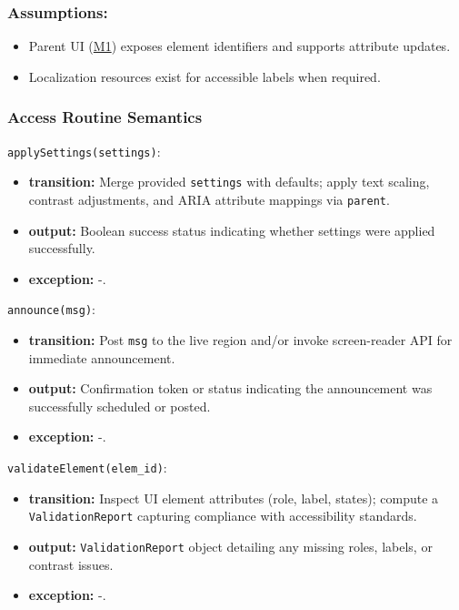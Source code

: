 \documentclass[12pt, titlepage]{article}
\begin{document}
\subsubsection{Assumptions:}
\begin{itemize}
  \item Parent UI (\hyperref[M1]{M1}) exposes element identifiers and supports attribute updates.
  \item Localization resources exist for accessible labels when required.
\end{itemize}
\subsubsection{Access Routine Semantics}

\noindent\texttt{applySettings(settings)}:
\begin{itemize}
\item \textbf{transition:} Merge provided \texttt{settings} with defaults; apply text scaling, contrast adjustments, and ARIA attribute mappings via \texttt{parent}.
\item \textbf{output:} Boolean success status indicating whether settings were applied successfully.
\item \textbf{exception:} -.
\end{itemize}

\noindent\texttt{announce(msg)}:
\begin{itemize}
\item \textbf{transition:} Post \texttt{msg} to the live region and/or invoke screen-reader API for immediate announcement.
\item \textbf{output:} Confirmation token or status indicating the announcement was successfully scheduled or posted.
\item \textbf{exception:} -.
\end{itemize}

\noindent\texttt{validateElement(elem\_id)}:
\begin{itemize}
  \item \textbf{transition:} Inspect UI element attributes (role, label, states); compute a \texttt{ValidationReport} capturing compliance with accessibility standards.
  \item \textbf{output:} \texttt{ValidationReport} object detailing any missing roles, labels, or contrast issues.
  \item \textbf{exception:} -.
\end{itemize}
\end{document}

